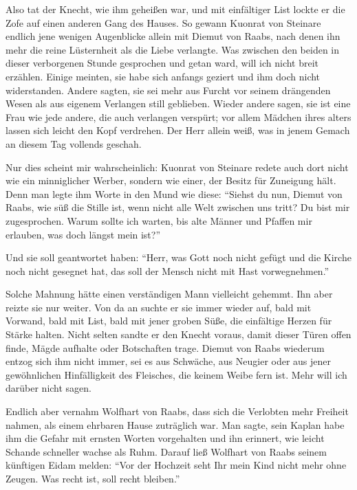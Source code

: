Also tat der \gls{Knecht}, wie ihm geheißen war, und mit einfältiger List lockte er die Zofe auf einen anderen Gang des Hauses. So gewann \gls{Kuonrat von Steinare} endlich jene wenigen Augenblicke allein mit \gls{Diemut von Raabs}, nach denen ihn mehr die reine Lüsternheit als die Liebe verlangte. Was zwischen den beiden in dieser verborgenen Stunde gesprochen und getan ward, will ich nicht breit erzählen. Einige meinten, sie habe sich anfangs geziert und ihm doch nicht widerstanden. Andere sagten, sie sei mehr aus Furcht vor seinem drängenden Wesen als aus eigenem Verlangen still geblieben. Wieder andere sagen, sie ist eine Frau wie jede andere, die auch verlangen verspürt; vor allem Mädchen ihres alters lassen sich leicht den Kopf verdrehen. Der Herr allein weiß, was in jenem Gemach an diesem Tag vollends geschah.

Nur dies scheint mir wahrscheinlich: \gls{Kuonrat von Steinare} redete auch dort nicht wie ein minniglicher Werber, sondern wie einer, der Besitz für Zuneigung hält. Denn man legte ihm Worte in den Mund wie diese: \enquote{Siehst du nun, \gls{Diemut von Raabs}, wie süß die Stille ist, wenn nicht alle Welt zwischen uns tritt? Du bist mir zugesprochen. Warum sollte ich warten, bis alte Männer und Pfaffen mir erlauben, was doch längst mein ist?}

Und sie soll geantwortet haben: \enquote{Herr, was Gott noch nicht gefügt und die Kirche noch nicht gesegnet hat, das soll der Mensch nicht mit Hast vorwegnehmen.}

Solche Mahnung hätte einen verständigen Mann vielleicht gehemmt. Ihn aber reizte sie nur weiter. Von da an suchte er sie immer wieder auf, bald mit Vorwand, bald mit List, bald mit jener groben Süße, die einfältige Herzen für Stärke halten. Nicht selten sandte er den \gls{Knecht} voraus, damit dieser Türen offen finde, Mägde aufhalte oder Botschaften trage. \gls{Diemut von Raabs} wiederum entzog sich ihm nicht immer, sei es aus Schwäche, aus Neugier oder aus jener gewöhnlichen Hinfälligkeit des Fleisches, die keinem Weibe fern ist. Mehr will ich darüber nicht sagen.

Endlich aber vernahm \gls{Wolfhart von Raabs}, dass sich die Verlobten mehr Freiheit nahmen, als einem ehrbaren Hause zuträglich war. Man sagte, sein Kaplan habe ihm die Gefahr mit ernsten Worten vorgehalten und ihn erinnert, wie leicht Schande schneller wachse als Ruhm. Darauf ließ \gls{Wolfhart von Raabs} seinem künftigen Eidam melden: \enquote{Vor der Hochzeit seht Ihr mein Kind nicht mehr ohne Zeugen. Was recht ist, soll recht bleiben.}

